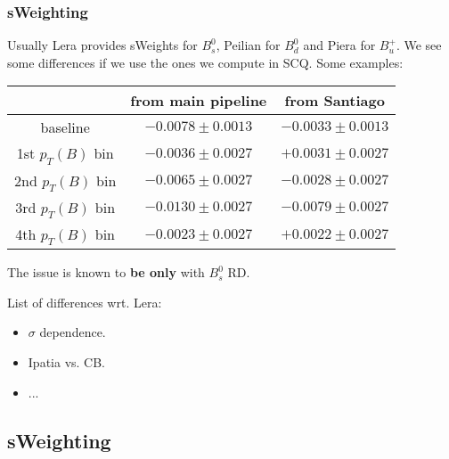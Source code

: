 \documentclass[9pt,aspectratio=43]{beamer}
\begin{document}
%
\begin{frame}[default]
\frametitle{sWeighting}

Usually Lera provides sWeights for $B_s^0$, Peilian for $B_d^0$ and Piera for $B_u^+$.
We see some differences if we use the ones we compute in SCQ. Some examples:

\begin{center}
  \begin{tabular}{c|c|c}
                     & from main pipeline     & from Santiago          \\ \hline
    baseline         & $ -0.0078 \pm 0.0013 $ & $ -0.0033 \pm 0.0013 $ \\
    1st $p_T(B)$ bin & $ -0.0036 \pm 0.0027 $ & $ +0.0031 \pm 0.0027 $ \\
    2nd $p_T(B)$ bin & $ -0.0065 \pm 0.0027 $ & $ -0.0028 \pm 0.0027 $ \\
    3rd $p_T(B)$ bin & $ -0.0130 \pm 0.0027 $ & $ -0.0079 \pm 0.0027 $ \\
    4th $p_T(B)$ bin & $ -0.0023 \pm 0.0027 $ & $ +0.0022 \pm 0.0027 $ \\
  \end{tabular}
\end{center}

The issue is known to \textbf{be only} with $B_s^0$ RD.

\medskip

List of differences wrt. Lera:
\begin{itemize}
  \item $\sigma$ dependence.
  \item Ipatia vs. CB.
  \item ...
\end{itemize}

\end{frame}
%


\subsection{sWeighting}
\end{document}
